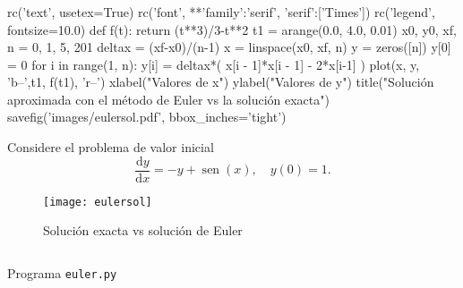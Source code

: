 
\begin{frame}[fragile]
\frametitle{\subsecname}

\begin{pylabcode}[plotsession]
rc('text', usetex=True)
rc('font', **{'family':'serif', 'serif':['Times']})
rc('legend', fontsize=10.0)
def f(t): return (t**3)/3-t**2
t1 = arange(0.0, 4.0, 0.01)
x0, y0, xf, n = 0, 1, 5, 201
deltax = (xf-x0)/(n-1)
x = linspace(x0, xf, n)
y = zeros([n])
y[0] = 0
for i in range(1, n): y[i] = deltax*( x[i - 1]*x[i - 1] - 2*x[i-1] )
plot(x, y, 'b--',t1, f(t1), 'r--')
xlabel("Valores de x")
ylabel("Valores de y")
title("Solución aproximada con el método de Euler vs la solución exacta")
savefig('images/eulersol.pdf', bbox_inches='tight')
\end{pylabcode}

\begin{minipage}{0.45\paperwidth}
\begin{example}
	Considere el problema de valor inicial \[ \frac{\mathrm{d}y}{\mathrm{d}x}=-y+\operatorname{sen}\left(x\right),\quad y\left(0\right)=1. \]
\end{example}
\vfill
\begin{figure}[H]
	\centering
	\texttt{[image: eulersol]}
	\caption{\label{fig:matlpotlib}Solución exacta vs solución de Euler}
\end{figure}
\end{minipage}
\hfill
\begin{minipage}{0.45\paperwidth}
		\begin{listing}[H]
		\inputminted{python}{./code/euler_01.py}
		\caption{Programa \texttt{euler.py}}
	\end{listing}
\end{minipage}
\end{frame}